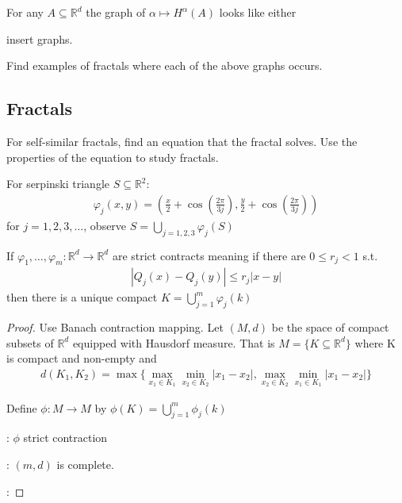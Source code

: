 For any $A \subseteq \mathbb{R}^d$ the graph of $\alpha \mapsto H^{\alpha} (A)$ looks like either 

insert graphs.

\begin{exercise}
	Find examples of fractals where each of the above graphs occurs.
\end{exercise}

\subsection{Fractals}

For self-similar fractals, find an equation that the fractal solves. Use the properties of the equation to study fractals.

\begin{example}
	For serpinski triangle $S \subseteq \mathbb{R}^2$:
	 \begin{align*}
	\varphi_{j} (x, y) = (\frac{x}{2} + \cos(\frac{2 \pi}{3 j}), \frac{y}{2} + \cos(\frac{2 \pi}{3 j}) )
	\end{align*} for $j = 1,2,3, \ldots$, observe
	$S = \bigcup_{j = 1,2,3} \varphi_j (S) $
\end{example}

\begin{theorem}
	If $\varphi_{1}, \ldots, \varphi_{m} : \mathbb{R}^d \to \mathbb{R}^d$ are strict contracts meaning if there are $0 \leq r_{j} < 1$ s.t.
	\begin{align*}
	| Q_j (x) - Q_j (y) | \leq r_{j} |x - y |
	\end{align*} then there is a unique compact
	 $K = \bigcup_{j=1}^{m} \varphi_{j} (k)$
\end{theorem}

\begin{proof}
	Use Banach contraction mapping. Let $(M,d)$ be the space of compact subsets of $\mathbb{R}^d$ equipped with Hausdorf measure.
	That is $M = \{K \subseteq \mathbb{R}^d\}$ where K is compact and non-empty
	and
	\begin{align*}
		d(K_1, K_2) = \max\{ \max_{x_1 \in K_1} \min_{x_2 \in K_2} |x_1 - x_2|, \max_{x_2 \in K_2} \min_{x_1 \in K_1} |x_1 - x_2| \}
	\end{align*}

	Define $\phi : M \to M$ by  $\phi (K) = \bigcup_{j=1}^{m} \phi_j (k)$
	\item[claim 1]: $\phi$ strict contraction
	\item[claim 2]: $(m,d)$ is complete.

	\item[Proof of claim 1]:
\end{proof}

